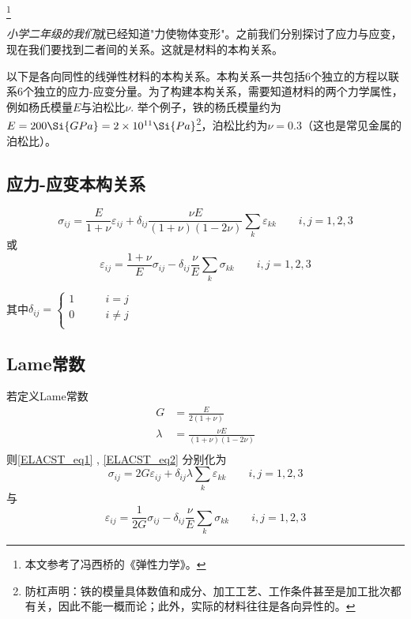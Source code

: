 
\begin{issues}
\issueDraft
\end{issues}
\footnote{本文参考了冯西桥的《弹性力学》。}

\textsl{小学二年级的我们}就已经知道"力使物体变形"。之前我们分别探讨了应力与应变，现在我们要找到二者间的关系。这就是材料的本构关系。

以下是各向同性的线弹性材料的本构关系。本构关系一共包括$6$个独立的方程以联系$6$个独立的应力-应变分量。为了构建本构关系，需要知道材料的两个力学属性，例如杨氏模量$E$与泊松比$\nu$. 举个例子，铁的杨氏模量约为$E = 200 \Si{GPa} = 2 \times 10^{11} \Si{Pa}$\footnote{防杠声明：铁的模量具体数值和成分、加工工艺、工作条件甚至是加工批次都有关，因此不能一概而论；此外，实际的材料往往是各向异性的。}，泊松比约为$\nu=0.3$（这也是常见金属的泊松比）。

\subsection{应力-应变本构关系}
\begin{equation}\label{ELACST_eq1}
\sigma_{ij}=\frac{E}{1+\nu}\varepsilon_{ij}+\delta_{ij}\frac{\nu E}{(1+\nu)(1-2\nu)}\sum_k\varepsilon_{kk}\qquad i,j=1,2,3
\end{equation}
或
\begin{equation}\label{ELACST_eq2}
\varepsilon_{ij}=\frac{1+\nu}{E}\sigma_{ij}-\delta_{ij}\frac{\nu}{E}\sum_k\sigma_{kk} \qquad i,j=1,2,3
\end{equation}

其中$\delta_{ij} = \left \{
\begin{aligned}
1 &\qquad i = j\\
0 &\qquad i \ne j\\
\end{aligned}
\right.
$

\subsection{Lame常数}
若定义Lame常数
\begin{equation}
\begin{aligned}
G&=\frac{E}{2(1+\nu)}\\
\lambda &= \frac{\nu E}{(1+\nu)(1-2\nu)}\\
\end{aligned}
\end{equation}
则\autoref{ELACST_eq1} , \autoref{ELACST_eq2} 分别化为
\begin{equation}
\sigma_{ij}=2G\varepsilon_{ij}+\delta_{ij}\lambda\sum_k\varepsilon_{kk}\qquad i,j=1,2,3
\end{equation}
与
\begin{equation}
\varepsilon_{ij}=\frac{1}{2G}\sigma_{ij}-\delta_{ij}\frac{\nu}{E}\sum_k\sigma_{kk} \qquad i,j=1,2,3
\end{equation}

